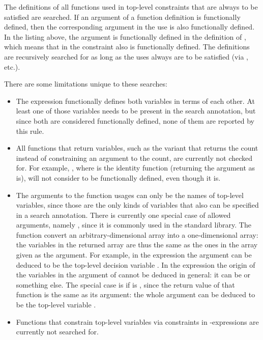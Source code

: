 \documentclass[a4paper,12pt]{article}
\begin{document}
The definitions of all functions used in top-level constraints that are always to be satisfied
are searched. If an argument of a function definition is
functionally defined, then the corresponding argument in the use is also functionally defined. In the
listing above, the argument  is functionally defined in the definition
of , which means that  in the constraint  also is
functionally defined. The definitions are recursively searched for as long as the uses
always are to be satisfied (via \mi{/\\}, etc.).

There are some limitations unique to these searches:
\begin{itemize}
  \item The expression  functionally defines both variables in terms of each other.
  At least one of those variables needs to be present in the search annotation, 
  but since both are considered functionally defined, none of them are reported
  by this rule.
  \item
  \begin{sloppypar}
  All functions that return variables, such as the variant  that 
  returns the count instead of constraining an argument to the count, are currently not checked for.
  For example, , where
   is the identity function (returning the argument as is), will not consider 
  to be functionally defined, even though it is.
  \end{sloppypar}
  \item The arguments to the function usages can only be the names of top-level variables,
  since those are the only kinds of variables that also can be specified in a search annotation.
  There is currently one special case of allowed arguments, namely , since it is commonly used in the standard library. 
  The function  convert an arbitrary-dimensional array into a one-dimensional array: the variables in the returned array are thus the
  same as the ones in the array given as the argument.
  For example, in the expression  the argument can be deduced to be the top-level decision
  variable . In the expression  the origin of the
  variables in the argument of  cannot be deduced in general: it can be  or something else.
  The special case is if  is , since the return value of that function is the same as its argument:
  the whole argument  can be deduced to be the top-level variable .
  \item Functions that constrain top-level variables via constraints in
  -expressions are currently not searched for.
\end{itemize}
\end{document}
